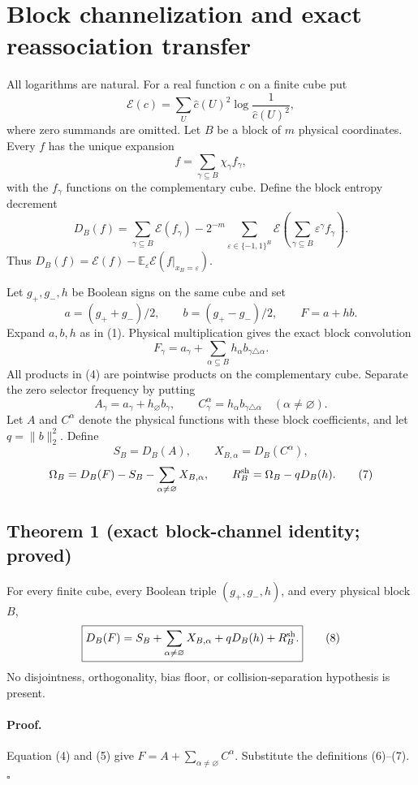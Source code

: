 \section*{Block channelization and exact reassociation transfer}

All logarithms are natural.  For a real function $c$ on a finite cube put
\[
 \mathcal E(c)=\sum_U \widehat c(U)^2
          \log\frac1{\widehat c(U)^2},
\]
where zero summands are omitted.  Let $B$ be a block of $m$ physical
coordinates.  Every $f$ has the unique expansion
\[
 f=\sum_{\gamma\subseteq B}\chi_\gamma f_\gamma,
\tag{1}
\]
with the $f_\gamma$ functions on the complementary cube.  Define the block
entropy decrement
\[
 D_B(f)=\sum_{\gamma\subseteq B}\mathcal E(f_\gamma)
 -2^{-m}\sum_{\varepsilon\in\{-1,1\}^{B}}
       \mathcal E\!\left(\sum_{\gamma\subseteq B}
                    \varepsilon^\gamma f_\gamma\right).
\tag{2}
\]
Thus $D_B(f)=\mathcal E(f)-\mathbb E_\varepsilon
\mathcal E(f|_{x_B=\varepsilon})$.

Let $g_+,g_-,h$ be Boolean signs on the same cube and set
\[
 a=(g_++g_-)/2,\qquad b=(g_+-g_-)/2,\qquad F=a+hb.
\tag{3}
\]
Expand $a,b,h$ as in (1).  Physical multiplication gives the exact block
convolution
\[
 F_\gamma=a_\gamma+\sum_{\alpha\subseteq B}
                 h_\alpha b_{\gamma\triangle\alpha}.
\tag{4}
\]
All products in (4) are pointwise products on the complementary cube.
Separate the zero selector frequency by putting
\[
 A_\gamma=a_\gamma+h_\varnothing b_\gamma,
 \qquad C^\alpha_\gamma=h_\alpha b_{\gamma\triangle\alpha}
       \quad(\alpha\ne\varnothing).
\tag{5}
\]
Let $A$ and $C^\alpha$ denote the physical functions with these block
coefficients, and let $q=\lVert b\rVert_2^2$.  Define
\[
 S_B=D_B(A),\qquad X_{B,\alpha}=D_B(C^\alpha),
\tag{6}
\]
\[
 \Omega_B=D_B(F)-S_B-\sum_{\alpha\ne\varnothing}X_{B,\alpha},
 \qquad R_B^{\rm sh}=\Omega_B-qD_B(h).
\tag{7}
\]

\subsection*{Theorem 1 (exact block-channel identity; proved)}

For every finite cube, every Boolean triple $(g_+,g_-,h)$, and every
physical block $B$,
\[
 \boxed{D_B(F)=S_B+\sum_{\alpha\ne\varnothing}X_{B,\alpha}
                 +qD_B(h)+R_B^{\rm sh}.}
\tag{8}
\]
No disjointness, orthogonality, bias floor, or collision-separation
hypothesis is present.

\paragraph{Proof.}
Equation (4) and (5) give
$F=A+\sum_{\alpha\ne\varnothing}C^\alpha$.  Substitute the definitions
(6)--(7). \(\square\)

